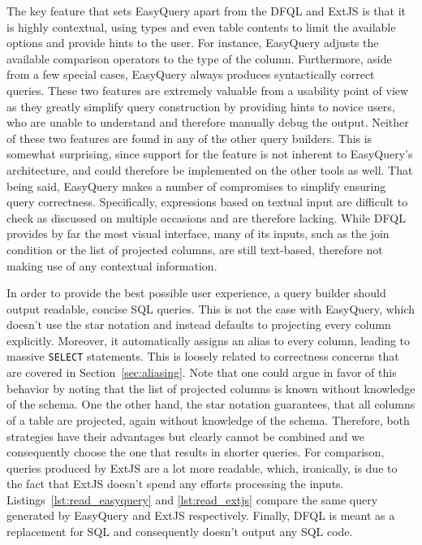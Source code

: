 \documentclass[11pt,a4paper]{globis-book}
\begin{document}
The key feature that sets EasyQuery apart from the DFQL and ExtJS is that it is highly contextual, using types and even table contents to limit the available options and provide hints to the user. For instance, EasyQuery adjusts the available comparison operators to the type of the column. Furthermore, aside from a few special cases, EasyQuery always produces syntactically correct queries. These two features are extremely valuable from a usability point of view as they greatly simplify query construction by providing hints to novice users, who are unable to understand and therefore manually debug the output. Neither of these two features are found in any of the other query builders. This is somewhat surprising, since support for the feature is not inherent to EasyQuery's architecture, and could therefore be implemented on the other tools as well. That being said, EasyQuery makes a number of compromises to simplify ensuring query correctness. Specifically, expressions based on textual input are difficult to check as discussed on multiple occasions and are therefore lacking. While DFQL provides by far the most visual interface, many of its inputs, such as the join condition or the list of projected columns, are still text-based, therefore not making use of any contextual information.

In order to provide the best possible user experience, a query builder should output readable, concise  SQL queries. This is not the case with EasyQuery, which doesn't use the star notation and instead defaults to projecting every column explicitly. Moreover, it automatically assigns an alias to every column, leading to massive \texttt{SELECT} statements. This is loosely related to correctness concerns that are covered in Section~\ref{sec:aliasing}. Note that one could argue in favor of this behavior by noting that the list of projected columns is known without knowledge of the schema. One the other hand, the star notation guarantees, that all columns of a table are projected, again without knowledge of the schema. Therefore, both strategies have their advantages but clearly cannot be combined and we consequently choose the one that results in shorter queries. For comparison, queries produced by ExtJS are a lot more readable, which, ironically, is due to the fact that ExtJS doesn't spend any efforts processing the inputs. Listings~\ref{lst:read_easyquery} and \ref{lst:read_extjs} compare the same query generated by EasyQuery and ExtJS respectively. Finally, DFQL is meant as a replacement for SQL and consequently doesn't output any SQL code.
\end{document}
